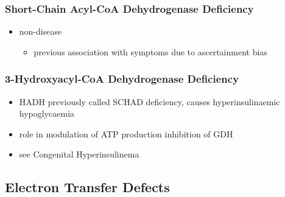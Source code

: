 \documentclass{scrartcl}
\begin{document}
\subsubsection{Short-Chain Acyl-CoA Dehydrogenase Deficiency}
\label{sec:org9ba3c66}
\begin{itemize}
\item non-disease
\begin{itemize}
\item previous association with symptoms due to ascertainment bias
\end{itemize}
\end{itemize}

\subsubsection{3-Hydroxyacyl-CoA Dehydrogenase Deficiency}
\label{sec:orgd02648b}
\begin{itemize}
\item HADH previously called SCHAD deficiency, causes hyperinsulinaemic
hypoglycaemia
\item role in modulation of ATP production inhibition of GDH
\item see Congenital Hyperinsulinema
\end{itemize}
\subsection{Electron Transfer Defects}
\label{sec:org12543f5}
\end{document}
